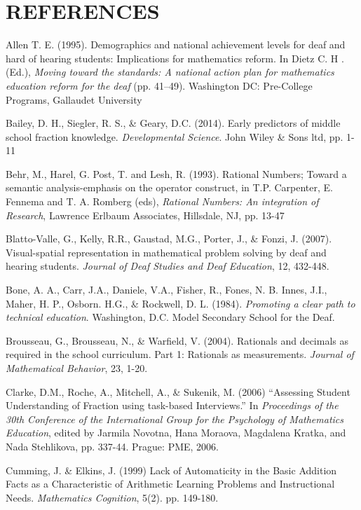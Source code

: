 \documentclass[11.5pt]{sig-alternate} %
\begin{document}
\clearpage
\section*{REFERENCES}\par 

\leftskip 0.25in
\parindent -0.25in 
Allen T. E. (1995). Demographics and national achievement levels for deaf and hard of hearing students: Implications for mathematics reform. In Dietz C. H . (Ed.), \textit{Moving toward the standards: A national action plan for mathematics education reform for the deaf} (pp. 41–49). Washington DC: Pre-College Programs, Gallaudet University

Bailey, D. H., Siegler, R. S., \& Geary, D.C. (2014). Early predictors of middle school fraction knowledge. \textit{Developmental Science}. John Wiley \& Sons ltd, pp. 1-11

Behr, M., Harel, G. Post, T. and Lesh, R. (1993). Rational Numbers; Toward a semantic analysis-emphasis on the operator construct, in T.P. Carpenter, E. Fennema and T. A. Romberg (eds), \textit{Rational Numbers: An integration of Research}, Lawrence Erlbaum Associates, Hillsdale, NJ, pp. 13-47

Blatto-Valle, G., Kelly, R.R., Gaustad, M.G., Porter, J., \& Fonzi, J. (2007). Visual-spatial representation in mathematical problem solving by deaf and hearing students. \textit{Journal of Deaf Studies and Deaf Education}, 12, 432-448.

Bone, A. A., Carr, J.A., Daniele, V.A., Fisher, R., Fones, N. B. Innes, J.I., Maher, H. P., Osborn. H.G., \& Rockwell, D. L. (1984).  \textit{Promoting a clear path to technical education}. Washington, D.C. Model Secondary School for the Deaf.

Brousseau, G., Brousseau, N., \& Warfield, V. (2004). Rationals and decimals as required in the school curriculum. Part 1: Rationals as measurements. \textit{Journal of Mathematical Behavior}, 23, 1-20.

Clarke, D.M., Roche, A., Mitchell, A., \& Sukenik, M. (2006) “Assessing Student Understanding of Fraction using task-based Interviews.” In \textit{Proceedings of the 30th Conference of the International Group for the Psychology of Mathematics Education}, edited by Jarmila Novotna, Hana Moraova, Magdalena Kratka, and Nada Stehlikova, pp. 337-44. Prague: PME, 2006.

Cumming, J.  \& Elkins, J. (1999) Lack of Automaticity in the Basic Addition Facts as a Characteristic of Arithmetic Learning Problems and Instructional Needs.  \textit{Mathematics Cognition}, 5(2).  pp. 149-180.
\end{document}
